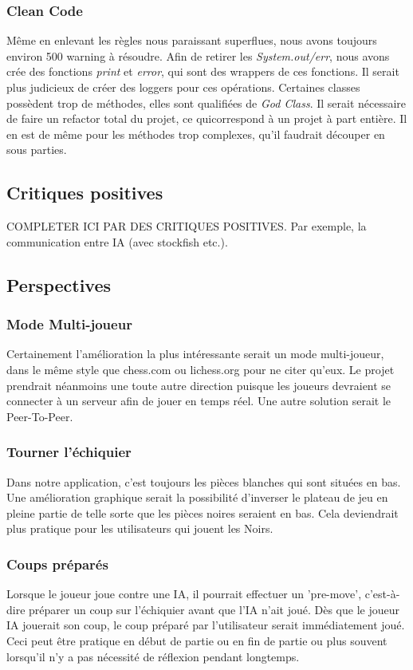 \documentclass{article}
\begin{document}
\subsubsection{Clean Code}
Même en enlevant les règles nous paraissant superflues, nous avons toujours environ 500 warning à résoudre.
Afin de retirer les \textit{System.out/err}, nous avons crée des fonctions \textit{print} et \textit{error}, qui sont des wrappers de ces fonctions. Il serait plus judicieux de créer
des loggers pour ces opérations.
Certaines classes possèdent trop de méthodes, elles sont qualifiées de \textit{God Class}. Il serait nécessaire de faire un refactor total du projet, ce quicorrespond à un projet à part entière.
Il en est de même pour les méthodes trop complexes, qu'il faudrait découper en sous parties.
\subsection{Critiques positives}
COMPLETER ICI PAR DES CRITIQUES POSITIVES.
Par exemple, la communication entre IA (avec stockfish etc.).

\subsection{Perspectives}
\subsubsection{Mode Multi-joueur}
Certainement l'amélioration la plus intéressante serait un mode multi-joueur, dans le même style que chess.com ou lichess.org pour ne citer qu'eux.
Le projet prendrait néanmoins une toute autre direction puisque les joueurs devraient se connecter à un serveur afin de jouer en temps réel. Une
autre solution serait le Peer-To-Peer.

\subsubsection{Tourner l'échiquier}
Dans notre application, c'est toujours les pièces blanches qui sont situées en bas. Une amélioration graphique serait la possibilité d'inverser le plateau
de jeu en pleine partie de telle sorte que les pièces noires seraient en bas. Cela deviendrait plus pratique pour les utilisateurs qui jouent les Noirs.

\subsubsection{Coups préparés}
Lorsque le joueur joue contre une IA, il pourrait effectuer un 'pre-move', c'est-à-dire préparer un coup sur l'échiquier avant que l'IA n'ait joué. Dès que 
le joueur IA jouerait son coup, le coup préparé par l'utilisateur serait immédiatement joué. Ceci peut être pratique en début de partie ou en fin de partie 
ou plus souvent lorsqu'il n'y a pas nécessité de réflexion pendant longtemps.
\end{document}
